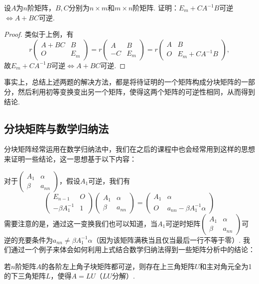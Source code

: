 \begin{example}{}{}
    设$A$为$n$阶矩阵，$B,C$分别为$n \times m$和$m \times n$阶矩阵. 证明：$E_m+CA^{-1}B$可逆$\iff A+BC$可逆.
\end{example}

\begin{proof}
    类似于上例，有
    \[r\begin{pmatrix}
            A+BC & B \\ O & E_m
        \end{pmatrix}=r\begin{pmatrix}
            A & B \\ -C & E_m
        \end{pmatrix}=r\begin{pmatrix}
            A & B \\ O & E_m+CA^{-1}B
        \end{pmatrix},\]
    故$E_m+CA^{-1}B$可逆$\iff A+BC$可逆.
\end{proof}

事实上，总结上述两题的解决方法，都是将待证明的一个矩阵构成分块矩阵的一部分，然后利用初等变换变出另一个矩阵，使得这两个矩阵的可逆性相同，从而得到结论.

\subsection{分块矩阵与数学归纳法}

分块矩阵经常运用在数学归纳法中，我们在之后的课程中也会经常用到这样的思想来证明一些结论，这一思想基于以下内容：

对于$\begin{pmatrix}
        A_1 & \alpha \\ \beta & a_{nn}
    \end{pmatrix}$，假设$A_1$可逆，我们有
\[\begin{pmatrix}
        E_{n-1} & O \\ -\beta A_1^{-1} & 1
    \end{pmatrix}\begin{pmatrix}
        A_1 & \alpha \\ \beta & a_{nn}
    \end{pmatrix}=\begin{pmatrix}
        A_1 & \alpha \\ O & a_{nn}-\beta A_1^{-1}\alpha
    \end{pmatrix}\]
需要注意的是，通过这一变换我们也可以知道，当$A_1$可逆时矩阵$\begin{pmatrix}
        A_1 & \alpha \\ \beta & a_{nn}
    \end{pmatrix}$可逆的充要条件为$a_{nn}\neq \beta A_1^{-1}\alpha$（因为该矩阵满秩当且仅当最后一行不等于零）. 我们通过一个例子来体会如何利用上式结合数学归纳法得到一些矩阵分析中的结论：
\begin{example}{}{}
    若$n$阶矩阵$A$的各阶左上角子块矩阵都可逆，则存在上三角矩阵$U$和主对角元全为1的下三角矩阵$L$，使得$A=LU$（$LU$分解）.
\end{example}

